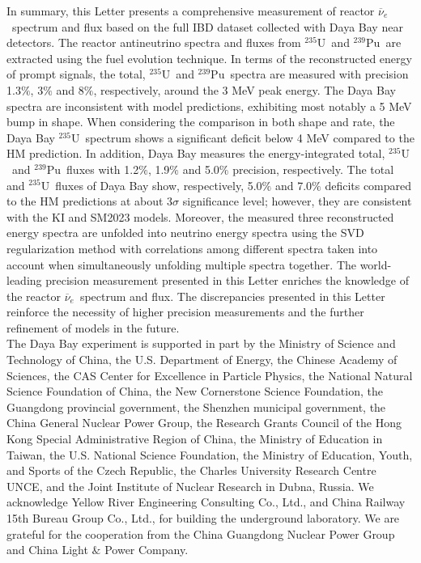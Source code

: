 \documentclass[aps,prl,showpacs,showkeys,amsmath,amssymb,twocolumn,floatfix,superscriptaddress,nofootinbib]{revtex4-1}
\newcommand{\Rnu}{$\overline{\nu}_e$}
\newcommand{\Ufive}{$\mathrm{^{235}U}$}
\newcommand{\Punine}{$\mathrm{^{239}Pu}$}
\begin{document}
In summary, this Letter presents a comprehensive measurement of reactor \Rnu\ spectrum and flux based on the full IBD dataset collected with Daya Bay near detectors.
The reactor antineutrino spectra and fluxes from \Ufive\ and \Punine\ are extracted using the fuel evolution technique.
In terms of the reconstructed energy of prompt signals, the total, \Ufive\ and \Punine\ spectra are measured with precision 1.3$\%$, 3$\%$ and 8$\%$, respectively, around the 3 MeV peak energy.
The Daya Bay spectra are inconsistent with model predictions, exhibiting most notably a 5 MeV bump in shape.
When considering the comparison in both shape and rate, the Daya Bay \Ufive\ spectrum shows a significant deficit below 4 MeV compared to the HM prediction.
In addition, Daya Bay measures the energy-integrated total, \Ufive\ and \Punine\ fluxes with 1.2$\%$, 1.9$\%$ and 5.0$\%$ precision, respectively.
The total and \Ufive\ fluxes of Daya Bay show, respectively, 5.0$\%$ and 7.0$\%$ deficits compared to the HM predictions at about 3$\sigma$ significance level; however, they are consistent with the KI and SM2023 models.
Moreover, the measured three reconstructed energy spectra are unfolded into neutrino energy spectra using the SVD regularization method with correlations among different spectra taken into account when simultaneously unfolding multiple spectra together.
The world-leading precision measurement presented in this Letter enriches the knowledge of the reactor \Rnu\ spectrum and flux.
The discrepancies presented in this Letter reinforce the necessity of higher precision measurements and the further refinement of models in the future. \\




The Daya Bay experiment is supported in part by the Ministry of Science and Technology of China, the U.S. Department of Energy, the Chinese Academy of Sciences, the CAS Center for Excellence in Particle Physics, the National Natural Science Foundation of China, the New Cornerstone Science Foundation, the Guangdong provincial government, the Shenzhen municipal government, the China General Nuclear Power Group, the Research Grants Council of the Hong Kong Special Administrative Region of China, the Ministry of Education in Taiwan, the U.S. National Science Foundation, the Ministry of Education, Youth, and Sports of the Czech Republic, the Charles University Research Centre UNCE, and the Joint Institute of Nuclear Research in Dubna, Russia. We acknowledge Yellow River Engineering Consulting Co., Ltd., and China Railway 15th Bureau Group Co., Ltd., for building the underground laboratory. We are grateful for the cooperation from the China Guangdong Nuclear Power Group and China Light $\&$ Power Company.


\nocite{*}

\end{document}
